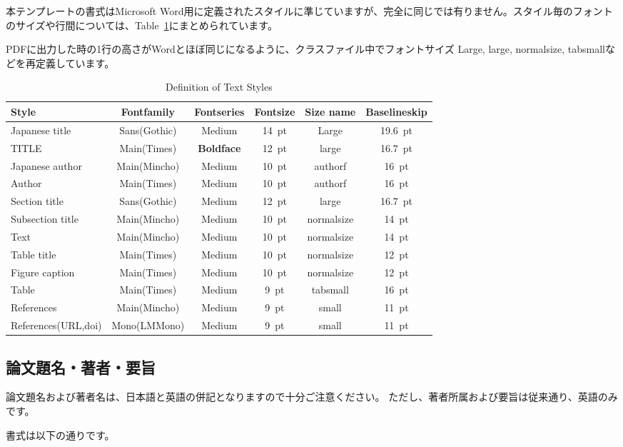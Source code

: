 \documentclass{PASJ2024}
\begin{document}
本テンプレートの書式はMicrosoft Word用に定義されたスタイルに準じていますが、完全に同じでは有りません。スタイル毎のフォントのサイズや行間については、Table~\ref{Tab2}にまとめられています。

PDFに出力した時の1行の高さがWordとほぼ同じになるように、クラスファイル中でフォントサイズ Large, large, normalsize, tabsmallなどを再定義しています。
%
\begin{table}[hbt]
\centering
\caption{Definition of Text Styles}
\begin{tabsmall}
\begin{tabular}{lccccc}
\toprule
 Style & Fontfamily &  Fontseries & Fontsize & Size name & Baselineskip\\
\midrule
Japanese title & Sans(Gothic) & Medium & 14~pt & Large & 19.6~pt\\
TITLE & Main(Times) & {\textbf{Boldface}} & 12~pt & large & 16.7~pt\\
Japanese author & Main(Mincho) & Medium & 10~pt & authorf & 16~pt\\
Author & Main(Times) & Medium & 10~pt & authorf & 16~pt\\
Section title & Sans(Gothic) & Medium & 12~pt & large & 16.7~pt\\
Subsection title & Main(Mincho) & Medium & 10~pt & normalsize & 14~pt\\
Text & Main(Mincho) & Medium & 10~pt & normalsize & 14~pt\\
Table title & Main(Times) & Medium & 10~pt & normalsize & 12~pt\\ 
Figure caption & Main(Times) & Medium & 10~pt & normalsize & 12~pt\\ 
Table & Main(Times) & Medium & 9~pt & tabsmall & 16~pt\\
References & Main(Mincho) & Medium & 9~pt & small & 11~pt\\
References(URL,doi) & Mono(LMMono) & Medium & 9~pt & small & 11~pt\\
\bottomrule
\end{tabular}
\end{tabsmall}
\label{Tab2}
\end{table}
%
\subsection{論文題名・著者・要旨}
論文題名および著者名は、日本語と英語の併記となりますので十分ご注意ください。
ただし、著者所属および要旨は従来通り、英語のみです。

書式は以下の通りです。
\end{document}
